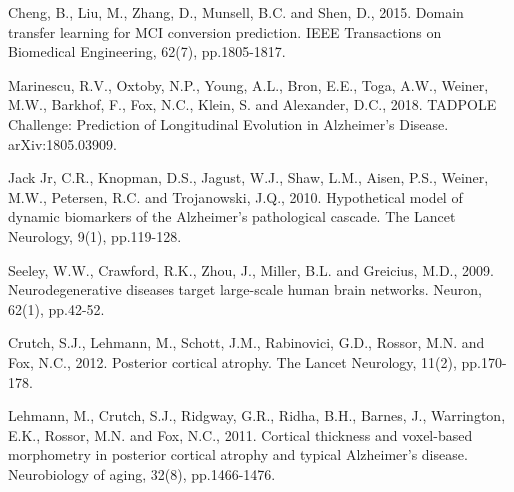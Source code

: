 \documentclass{llncs}
\begin{document}
\begin{thebibliography}{5}
Cheng, B., Liu, M., Zhang, D., Munsell, B.C. and Shen, D., 2015. Domain transfer learning for MCI conversion prediction. IEEE Transactions on Biomedical Engineering, 62(7), pp.1805-1817.

Marinescu, R.V., Oxtoby, N.P., Young, A.L., Bron, E.E., Toga, A.W., Weiner, M.W., Barkhof, F., Fox, N.C., Klein, S. and Alexander, D.C., 2018. TADPOLE Challenge: Prediction of Longitudinal Evolution in Alzheimer's Disease. arXiv:1805.03909.

Jack Jr, C.R., Knopman, D.S., Jagust, W.J., Shaw, L.M., Aisen, P.S., Weiner, M.W., Petersen, R.C. and Trojanowski, J.Q., 2010. Hypothetical model of dynamic biomarkers of the Alzheimer's pathological cascade. The Lancet Neurology, 9(1), pp.119-128.

Seeley, W.W., Crawford, R.K., Zhou, J., Miller, B.L. and Greicius, M.D., 2009. Neurodegenerative diseases target large-scale human brain networks. Neuron, 62(1), pp.42-52.




Crutch, S.J., Lehmann, M., Schott, J.M., Rabinovici, G.D., Rossor, M.N. and Fox, N.C., 2012. Posterior cortical atrophy. The Lancet Neurology, 11(2), pp.170-178.

Lehmann, M., Crutch, S.J., Ridgway, G.R., Ridha, B.H., Barnes, J., Warrington, E.K., Rossor, M.N. and Fox, N.C., 2011. Cortical thickness and voxel-based morphometry in posterior cortical atrophy and typical Alzheimer's disease. Neurobiology of aging, 32(8), pp.1466-1476.

\end{thebibliography}

\clearpage
\end{document}

